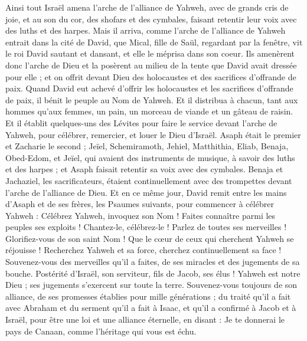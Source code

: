 \begin{multicols}{2}
Ainsi tout Israël amena l'arche de l'alliance de Yahweh, avec de grands cris de joie, et au son du cor, des shofars et des cymbales, faisant retentir leur voix avec des luths et des harpes.
Mais il arriva, comme l'arche de l'alliance de Yahweh entrait dans la cité de David, que Mical, fille de Saül, regardant par la fenêtre, vit le roi David sautant et dansant, et elle le méprisa dans son coeur.
\VerseOne{}Ils amenèrent donc l'arche de Dieu et la posèrent au milieu de la tente que David avait dressée pour elle ; et on offrit devant Dieu des holocaustes et des sacrifices d'offrande de paix.
Quand David eut achevé d'offrir les holocaustes et les sacrifices d'offrande de paix, il bénit le peuple au Nom de Yahweh.
Et il distribua à chacun, tant aux hommes qu'aux femmes, un pain, un morceau de viande et un gâteau de raisin.
Et il établit quelques-uns des Lévites pour faire le service devant l'arche de Yahweh, pour célébrer, remercier, et louer le Dieu d'Israël.
Asaph était le premier et Zacharie le second ; Jeïel, Schemiramoth, Jehiel, Matthithia, Eliab, Benaja, Obed-Edom, et Jeïel, qui avaient des instruments de musique, à savoir des luths et des harpes ; et Asaph faisait retentir sa voix avec des cymbales.
Benaja et Jachaziel, les sacrificateurs, étaient continuellement avec des trompettes devant l'arche de l'alliance de Dieu.
Et en ce même jour, David remit entre les mains d'Asaph et de ses frères, les Psaumes suivants, pour commencer à célébrer Yahweh :
Célébrez Yahweh, invoquez son Nom ! Faites connaître parmi les peuples ses exploits !
Chantez-le, célébrez-le ! Parlez de toutes ses merveilles !
Glorifiez-vous de son saint Nom ! Que le cœur de ceux qui cherchent Yahweh se réjouisse !
Recherchez Yahweh et sa force, cherchez continuellement sa face !
Souvenez-vous des merveilles qu'il a faites, de ses miracles et des jugements de sa bouche.
Postérité d'Israël, son serviteur, fils de Jacob, ses élus !
Yahweh est notre Dieu ; ses jugements s'exercent sur toute la terre.
Souvenez-vous toujours de son alliance, de ses promesses établies pour mille générations ;
du traité qu'il a fait avec Abraham et du serment qu'il a fait à Isaac,
et qu'il a confirmé à Jacob et à Israël, pour être une loi et une alliance éternelle,
en disant : Je te donnerai le pays de Canaan, comme l'héritage qui vous est échu.

\end{multicols}
